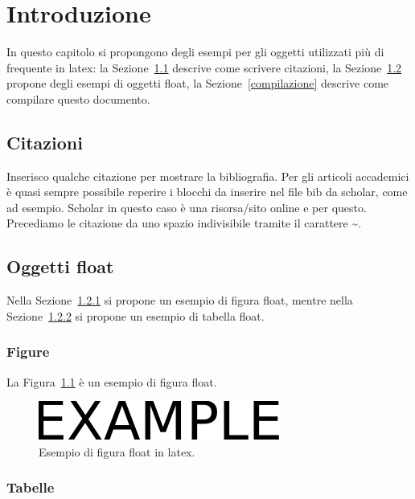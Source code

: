 \listoftodos

\chapter{Introduzione}
\label{introduzione}

In questo capitolo si propongono degli esempi per gli oggetti utilizzati più di frequente in latex: la Sezione~\ref{citazioni} descrive come scrivere citazioni, la Sezione~\ref{oggetti-float} propone degli esempi di oggetti float, la Sezione~\ref{compilazione} descrive come compilare questo documento.

\section{Citazioni}
\label{citazioni}

Inserisco qualche citazione per mostrare la bibliografia. Per gli articoli accademici è quasi sempre possibile reperire i blocchi da inserire nel file bib da scholar, come ad esempio. Scholar in questo caso è una risorsa/sito online e per questo. Precediamo le citazione da uno spazio indivisibile tramite il carattere \textasciitilde.

\section{Oggetti float}
\label{oggetti-float}

Nella Sezione~\ref{figure-float} si propone un esempio di figura float, mentre nella Sezione~\ref{tabelle-float} si propone un esempio di tabella float.

\subsection{Figure}
\label{figure-float}

La Figura~\ref{fig:esempio} è un esempio di figura float.

\begin{figure}[htb]
    \centering
    \includegraphics[width=.4\columnwidth]{figures/example.pdf}
    \caption{Esempio di figura float in latex.}
\label{fig:esempio}
\end{figure}

\subsection{Tabelle}
\label{tabelle-float}

